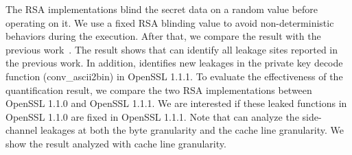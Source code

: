 The RSA implementations blind the secret data on a random value before operating on it. We use a fixed RSA blinding value to avoid non-deterministic behaviors during the execution. After that, we compare the result with the previous work~\cite{bao2021abacus,203878}. The result shows that \ctool{} can identify all leakage sites reported in the previous work. In addition, \ctool{} identifies new leakages in the private key decode function (\textsf{conv\_ascii2bin}) in OpenSSL 1.1.1.  To evaluate the effectiveness of the quantification result, we compare the two RSA implementations between OpenSSL 1.1.0 and OpenSSL 1.1.1.  We are interested if these leaked functions in OpenSSL 1.1.0 are fixed in OpenSSL 1.1.1.
Note that \ctool{} can analyze the side-channel leakages at both the byte granularity and the cache line granularity. We show the result analyzed with cache line granularity. 

